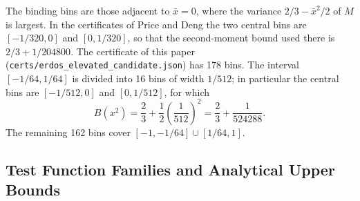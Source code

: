 \documentclass[11pt,a4paper]{article}
\theoremstyle{definition}
\theoremstyle{remark}
\begin{document}
The binding bins are those adjacent to $\bar{x} = 0$, where the variance $2/3 - \bar{x}^2/2$ of $M$ is largest. In the certificates of Price and Deng the two central bins are $[-1/320, 0]$ and $[0, 1/320]$, so that the second-moment bound used there is $2/3 + 1/204800$. The certificate of this paper (\nolinkurl{certs/erdos_elevated_candidate.json}) has 178 bins. The interval $[-1/64, 1/64]$ is divided into 16 bins of width $1/512$; in particular the central bins are $[-1/512, 0]$ and $[0, 1/512]$, for which
\begin{equation}
B(x^2) = \frac{2}{3} + \frac{1}{2}\left(\frac{1}{512}\right)^2 = \frac{2}{3} + \frac{1}{524288}.
\end{equation}
The remaining 162 bins cover $[-1, -1/64] \cup [1/64, 1]$.

\subsection{Test Function Families and Analytical Upper Bounds}
\label{subsec:families}
\end{document}
